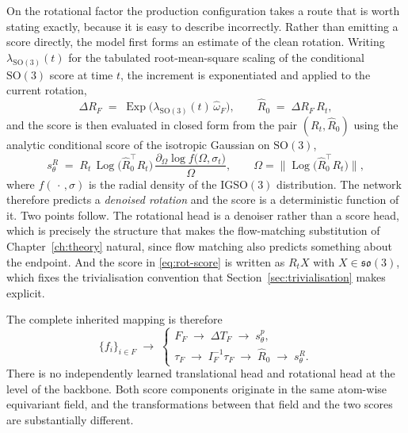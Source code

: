 \documentclass[11pt,a4paper]{report}
\theoremstyle{plain}
\theoremstyle{definition}
\theoremstyle{remark}
\newcommand{\SOthree}{\mathrm{SO}(3)}
\newcommand{\sothree}{\mathfrak{so}(3)}
\newcommand{\Exp}{\operatorname{Exp}}
\newcommand{\Log}{\operatorname{Log}}
\newcommand{\skewm}[1]{\widehat{#1}}
\newcommand{\Rot}{R}
\begin{document}
On the rotational factor the production configuration takes a route that is
worth stating exactly, because it is easy to describe incorrectly. Rather than
emitting a score directly, the model first forms an estimate of the clean
rotation. Writing $\lambda_{\SOthree}(t)$ for the tabulated root-mean-square
scaling of the conditional $\SOthree$ score at time $t$, the increment is
exponentiated and applied to the current rotation,
\begin{equation}
  \Delta \Rot_F \;=\; \Exp\!\bigl(\lambda_{\SOthree}(t)\,\skewm{\omega}_F\bigr),
  \qquad
  \widehat{\Rot}_0 \;=\; \Delta \Rot_F\, \Rot_t ,
  \label{eq:rot-denoised}
\end{equation}
and the score is then evaluated in closed form from the pair
$(\Rot_t, \widehat{\Rot}_0)$ using the analytic conditional score of the
isotropic Gaussian on $\SOthree$,
\begin{equation}
  s^{\Rot}_\theta
  \;=\; \Rot_t \,\Log\bigl(\widehat{\Rot}_0^{\top}\Rot_t\bigr)\,
        \frac{\partial_\Omega \log f\bigl(\Omega,\sigma_t\bigr)}{\Omega},
  \qquad
  \Omega = \bigl\|\Log\bigl(\widehat{\Rot}_0^{\top}\Rot_t\bigr)\bigr\| ,
  \label{eq:rot-score}
\end{equation}
where $f(\,\cdot\,,\sigma)$ is the radial density of the $\mathrm{IGSO}(3)$
distribution. The network therefore predicts a \emph{denoised rotation} and
the score is a deterministic function of it. Two points follow. The rotational
head is a denoiser rather than a score head, which is precisely the structure
that makes the flow-matching substitution of Chapter~\ref{ch:theory} natural,
since flow matching also predicts something about the endpoint. And the score
in \eqref{eq:rot-score} is written as $\Rot_t X$ with $X \in \sothree$, which
fixes the trivialisation convention that Section~\ref{sec:trivialisation}
makes explicit.

The complete inherited mapping is therefore
\begin{equation}
  \{f_i\}_{i\in F}
  \;\longrightarrow\;
  \begin{cases}
    F_F \;\longrightarrow\; \Delta T_F \;\longrightarrow\; s^{p}_\theta, \\[0.6ex]
    \tau_F \;\longrightarrow\; I_F^{-1}\tau_F \;\longrightarrow\;
      \widehat{\Rot}_0 \;\longrightarrow\; s^{\Rot}_\theta .
  \end{cases}
  \label{eq:readout-summary}
\end{equation}
There is no independently learned translational head and rotational head at
the level of the backbone. Both score components originate in the same
atom-wise equivariant field, and the transformations between that field and
the two scores are substantially different.
\end{document}
